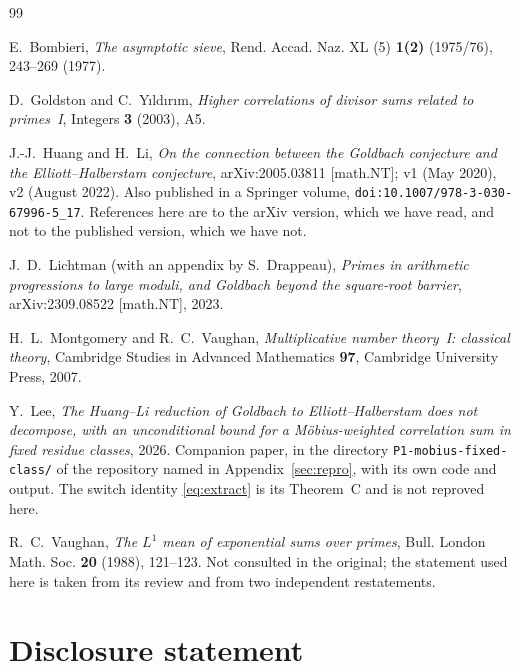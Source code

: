 \documentclass[11pt,a4paper]{article}
\theoremstyle{plain}
\theoremstyle{definition}
\theoremstyle{remark}
\begin{document}
\begin{thebibliography}{99}

 E.~Bombieri, \emph{The asymptotic sieve},
Rend. Accad. Naz. XL (5) \textbf{1(2)} (1975/76), 243--269 (1977).

 D.~Goldston and C.~Y{\i}ld{\i}r{\i}m,
\emph{Higher correlations of divisor sums related to primes~I},
Integers \textbf{3} (2003), A5.

 J.-J.~Huang and H.~Li, \emph{On the connection between
the Goldbach conjecture and the Elliott--Halberstam conjecture},
arXiv:2005.03811 [math.NT]; v1 (May 2020), v2 (August 2022). Also
published in a Springer volume,
\texttt{doi:10.1007/978-3-030-67996-5\_17}. References here are to the
arXiv version, which we have read, and not to the published version,
which we have not.

 J.~D.~Lichtman (with an appendix by S.~Drappeau),
\emph{Primes in arithmetic progressions to large moduli, and Goldbach
beyond the square-root barrier}, arXiv:2309.08522 [math.NT], 2023.

 H.~L.~Montgomery and R.~C.~Vaughan,
\emph{Multiplicative number theory~I: classical theory}, Cambridge
Studies in Advanced Mathematics \textbf{97}, Cambridge University
Press, 2007.

 Y.~Lee, \emph{The Huang--Li reduction of Goldbach to
Elliott--Halberstam does not decompose, with an unconditional bound for
a M\"obius-weighted correlation sum in fixed residue classes}, 2026.
Companion paper, in the directory \texttt{P1-mobius-fixed-class/} of
the repository named in Appendix~\ref{sec:repro}, with its own code and
output. The switch identity \eqref{eq:extract} is its Theorem~C and is
not reproved here.

 R.~C.~Vaughan, \emph{The $L^1$ mean of exponential
sums over primes}, Bull. London Math. Soc. \textbf{20} (1988),
121--123. Not consulted in the original; the statement used here is
taken from its review and from two independent restatements.

\end{thebibliography}

\section*{Disclosure statement}
\end{document}
